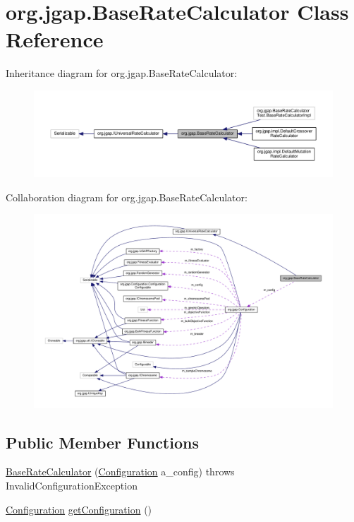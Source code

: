 \hypertarget{classorg_1_1jgap_1_1_base_rate_calculator}{\section{org.\-jgap.\-Base\-Rate\-Calculator Class Reference}
\label{classorg_1_1jgap_1_1_base_rate_calculator}
}


Inheritance diagram for org.\-jgap.\-Base\-Rate\-Calculator\-:
\nopagebreak
\begin{figure}[H]
\begin{center}
\leavevmode
\includegraphics[width=350pt]{classorg_1_1jgap_1_1_base_rate_calculator__inherit__graph}
\end{center}
\end{figure}


Collaboration diagram for org.\-jgap.\-Base\-Rate\-Calculator\-:
\nopagebreak
\begin{figure}[H]
\begin{center}
\leavevmode
\includegraphics[width=350pt]{classorg_1_1jgap_1_1_base_rate_calculator__coll__graph}
\end{center}
\end{figure}
\subsection*{Public Member Functions}
\begin{DoxyCompactItemize}
\item 
\hyperlink{classorg_1_1jgap_1_1_base_rate_calculator_af142977d13e5c3719973233312e4c214}{Base\-Rate\-Calculator} (\hyperlink{classorg_1_1jgap_1_1_configuration}{Configuration} a\-\_\-config)  throws Invalid\-Configuration\-Exception 
\item 
\hyperlink{classorg_1_1jgap_1_1_configuration}{Configuration} \hyperlink{classorg_1_1jgap_1_1_base_rate_calculator_a73cc1aa27dc6be2fc0eb3c21c88a34a6}{get\-Configuration} ()
\end{DoxyCompactItemize}

